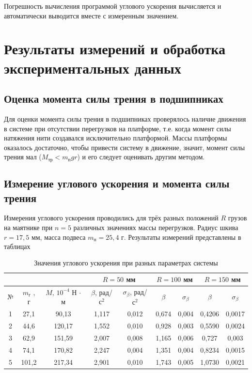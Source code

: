 \documentclass[a4paper,12pt]{article} %
\begin{document}
Погрешность вычисления программой углового ускорения вычисляется и автоматически выводится вместе с измеренным значением.

\section{Результаты измерений и обработка экспериментальных данных}

\subsection{Оценка момента силы трения в подшипниках}

Для оценки момента силы трения в подшипниках проверялось наличие движения в системе при отсутствии перегрузков на платформе, т.е. когда момент силы натяжения нити создавался исключительно платформой. Массы платформы оказалось достаточно, чтобы привести систему в движение, значит, момент силы трения мал ($ M_\text{тр} < m_\text{п}gr $) и его следует оценивать другим методом.

\subsection{Измерение углового ускорения и момента силы трения}

Измерения углового ускорения проводились для трёх разных положений $ R $ грузов на маятнике при $n=5$ различных значениях массы перегрузков. Радиус шкива $ r = 17,5 $ мм, масса подвеса $ m_\text{п} = 25,4 $ г.  Результаты измерений представлены в таблицах 

\begin{table}[h]
    \centering
    \begin{tabular}{|c|c|c|c|c|c|c|c|c|} \hline
         \multicolumn{3}{|c|}{ } & \multicolumn{2}{c|}{$R = 50$ мм} & \multicolumn{2}{c|}{$R = 100$ мм} & \multicolumn{2}{c|}{$R = 150$ мм} \\ \hline
        № & $m_\text{г}$ , г & $ M $, $ 10^{-4} $ Н $\cdot$ м & $\beta$, рад/$ \text{с}^2 $ & $\sigma_\beta$, рад/$ \text{с}^2 $ & $\beta$ & $\sigma_\beta$ & $\beta$ & $\sigma_\beta$ \\ \hline
        1 & 27,1 & 90,13 & 1,117 & 0,012 & 0,674 & 0,004 & 0,4206 & 0,0017 \\ \hline
        2 & 44,6 & 120,17 & 1,552 & 0,010 & 0,928 & 0,003 & 0,5590 & 0,0024 \\ \hline
        3 & 62,9 & 151,59 & 2,007 & 0,008 & 1,165 & 0,006 & 0,727 & 0,003 \\ \hline
        4 & 74,1 & 170,82 & 2,247 & 0,004 & 1,351 & 0,004 & 0,8234 & 0,0015 \\ \hline
        5 & 101,2 & 217,34 & 2,901 & 0,010 & 1,743 & 0,005 & 1,0730 & 0,0021 \\ \hline 
    \end{tabular}
    \caption{Значения углового ускорения при разных параметрах системы}
    \label{tab:res1}
\end{table}
\end{document}
